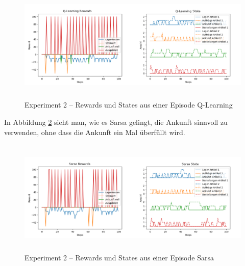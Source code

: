 \begin{figure}[H]
\centering
  \includegraphics[height=5.5cm]{img/plots/exp-2/q-rew-state.png}
  \caption{Experiment 2 – Rewards und States aus einer Episode Q-Learning}
    \label{fig:e2-pol-q}
\end{figure}
In Abbildung \ref{fig:e2-pol-sarsa} sieht man, wie es Sarsa gelingt, die Ankunft sinnvoll zu verwenden, ohne dass die Ankunft ein Mal überfüllt wird. 
\begin{figure}[H]
    \centering
  \includegraphics[height=5.5cm]{img/plots/exp-2/sarsa-rew-state.png}
  \caption{Experiment 2 – Rewards und States aus einer Episode Sarsa}
    \label{fig:e2-pol-sarsa}
\end{figure}

